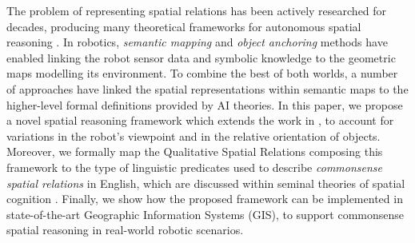 \documentclass{article}
\begin{document}
The problem of representing spatial relations has been actively researched for decades, producing many theoretical frameworks for autonomous spatial reasoning \cite{cohn_chapter_2008}. In robotics, \textit{semantic mapping} \cite{nuchter2008towards,kostavelis2015semantic} and \textit{object anchoring} methods \cite{coradeschi2003introduction} have enabled linking the robot sensor data and symbolic knowledge to the geometric maps modelling its environment. To combine the best of both worlds, a number of approaches \cite{deeken_grounding_2018,kunze_combining_2014,young_semantic_2017} have linked the spatial representations within semantic maps to the higher-level formal definitions provided by AI theories. 
In this paper, we propose a novel spatial reasoning framework which extends the work in \cite{deeken_grounding_2018,borrmann_query_2010}, to account for variations in the robot's viewpoint and in the relative orientation of objects. Moreover, we formally map the Qualitative Spatial Relations composing this framework to the type of linguistic predicates used to describe \textit{commonsense spatial relations} in English, which are discussed within seminal theories of spatial cognition \cite{landau_what_1993,herskovits_language_1997}. Finally, we show how the proposed framework can be implemented in state-of-the-art Geographic Information Systems (GIS), to support commonsense spatial reasoning in real-world robotic scenarios. 

\end{document}
